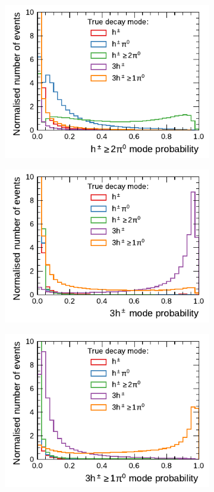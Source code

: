 \begin{figure}[!ht]
\begin{subfigure}{0.48\textwidth}
  \end{subfigure}
  \begin{subfigure}{0.48\textwidth}
    \centering
    \includegraphics{./figures/decay_mode_classification/mode_proba_baseline_ptcut_1_5/proba_1pXn.pdf}
  \end{subfigure}\hfill
  \begin{subfigure}{0.48\textwidth}
    \centering
    \includegraphics{./figures/decay_mode_classification/mode_proba_baseline_ptcut_1_5/proba_3p0n.pdf}
  \end{subfigure}
  \begin{subfigure}{0.48\textwidth}
    \centering
    \includegraphics{./figures/decay_mode_classification/mode_proba_baseline_ptcut_1_5/proba_3pXn.pdf}

\end{subfigure}
\end{figure}
